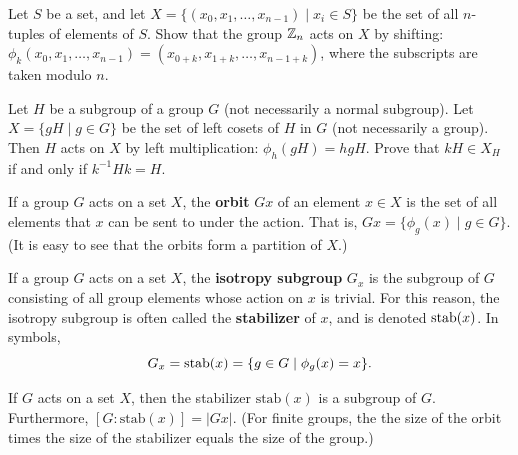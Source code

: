 \begin{problem}\label{prob:shiftaction}
Let $S$ be a set, and let $X = \{(x_0, x_1, \ldots, x_{n-1}) \mid x_i \in S \}$ be the set of all $n$-tuples of elements of $S$. Show that the group $\mathbb{Z}_n$ acts on $X$ by shifting: $\phi_k(x_0,x_1,\ldots,x_{n-1}) = (x_{0+k}, x_{1+k}, \ldots, x_{n-1+k})$, where the subscripts are taken modulo $n$.
\end{problem}

\begin{problem}\label{prob:leftcosetact}
Let $H$ be a subgroup of a group $G$ (not necessarily a normal subgroup).  Let $X = \{gH \mid g\in G\}$ be the set of left cosets of $H$ in $G$ (not necessarily a group).  Then $H$ acts on $X$ by left multiplication: $\phi_h(gH) = hgH$.  Prove that $kH \in X_H$ if and only if $k^{-1}Hk = H$.
\end{problem}

\begin{definition}
 If a group $G$ acts on a set $X$, the \textbf{orbit} $Gx$ of an element $x \in X$ is the set of all elements that $x$ can be sent to under the action.  That is, $Gx = \{ \phi_g(x) \mid g \in G \}$.  (It is easy to see that the orbits form a partition of $X$.)
\end{definition}

\begin{definition}
 If a group $G$ acts on a set $X$, the \textbf{isotropy subgroup} $G_x$ is the subgroup of $G$ consisting of all group elements whose action on $x$ is trivial.  For this reason, the isotropy subgroup is often called the \textbf{stabilizer} of $x$, and is denoted $\operatorname{stab}(x)$.  In symbols,
 $$G_x = \operatorname{stab}(x) = \{ g \in G \mid \phi_g(x) = x \}.$$
\end{definition}

\begin{theorem}\label{thm:orbitstab}
 If $G$ acts on a set $X$, then the stabilizer $\mbox{stab}(x)$ is a subgroup of $G$. Furthermore, $[G:\mbox{stab}(x)] = \lvert Gx \rvert$. (For finite groups, the the size of the orbit times the size of the stabilizer equals the size of the group.)
\begin{annotation}
\end{annotation}
\end{theorem}

